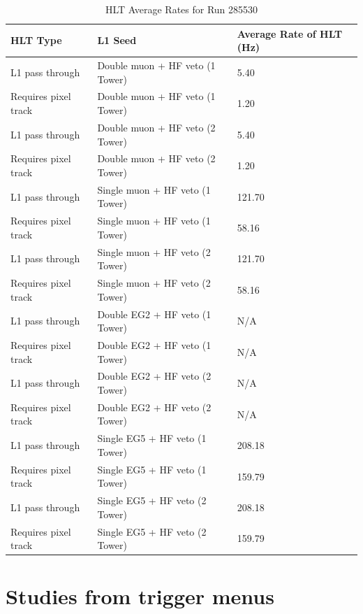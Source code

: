 \begin{table}[h!]
\centering
\caption{HLT Average Rates for Run 285530}
\label{my-label}
\begin{tabular}{@{}lll@{}}
\toprule
HLT Type             & L1 Seed                           & Average Rate of HLT (Hz) \\ \midrule
L1 pass through      & Double muon + HF veto (1 Tower) & 5.40	                    \\
Requires pixel track & Double muon + HF veto (1 Tower) & 1.20	                    \\
L1 pass through      & Double muon + HF veto (2 Tower) & 5.40                     	\\
Requires pixel track & Double muon + HF veto (2 Tower) & 1.20                     	\\
L1 pass through      & Single muon + HF veto (1 Tower) & 121.70                   	\\
Requires pixel track & Single muon + HF veto (1 Tower) & 58.16                    	\\
L1 pass through      & Single muon + HF veto (2 Tower) & 121.70	                    \\
Requires pixel track & Single muon + HF veto (2 Tower) & 58.16                    	\\
L1 pass through      & Double EG2 + HF veto (1 Tower)  & N/A                     	\\
Requires pixel track & Double EG2 + HF veto (1 Tower)  & N/A                     	\\
L1 pass through      & Double EG2 + HF veto (2 Tower)  & N/A                  		\\
Requires pixel track & Double EG2 + HF veto (2 Tower)  & N/A                     	\\ 
L1 pass through      & Single EG5 + HF veto (1 Tower)  & 208.18          			\\
Requires pixel track & Single EG5 + HF veto (1 Tower)  & 159.79                     \\
L1 pass through      & Single EG5 + HF veto (2 Tower)  & 208.18                     \\
Requires pixel track & Single EG5 + HF veto (2 Tower)  & 159.79	                    \\ \bottomrule
\end{tabular}
\end{table}

\section{Studies from trigger menus}

